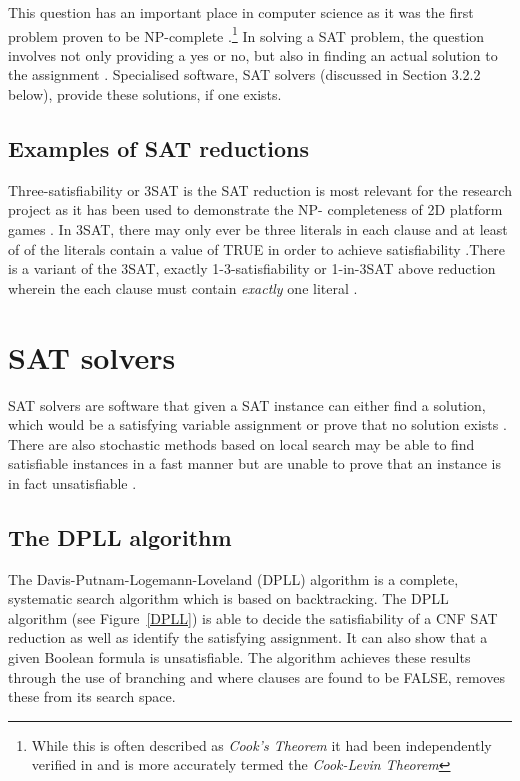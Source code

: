 \documentclass[11pt, a4paper, oneside]{report} %
\begin{document}
This question has an important place in computer science as it was the first problem proven to be
NP-complete \cite{cook1971complexity}.\footnote{While this is often described as \textit{Cook's
Theorem} it had been independently verified in \cite{levin1973universal} and is more accurately
termed the \textit{Cook-Levin Theorem}} In solving a SAT problem, the question involves not only
providing a yes or no, but also in finding an actual solution to the assignment
\cite{zhang2002quest}. Specialised software, SAT solvers (discussed in Section 3.2.2 below), provide
these solutions, if one exists.

\subsection{Examples of SAT reductions}

Three-satisfiability or 3SAT is the SAT reduction is most relevant for the research project as it
has been used to demonstrate the NP- completeness of 2D platform games  \cite{Aloupis2012}. In 3SAT,
there may only ever be three literals in each clause and at least of of the literals contain a value
of TRUE in order to achieve satisfiability \cite{balyo2010solving}.There is a variant of the 3SAT,
exactly 1-3-satisfiability or 1-in-3SAT above reduction wherein the each clause must contain
\textit{exactly} one literal \cite{balyo2010solving, du2011theory}.


\section{SAT solvers}

SAT solvers are software that given a SAT instance can either find a solution, which would be a
satisfying variable assignment or prove that no solution exists \cite{zhang2002quest}. There are
also stochastic methods based on local search may be able to find satisfiable instances in a fast
manner but are unable to prove that an instance is in fact unsatisfiable
\cite{gomes2008satisfiability}.


\subsection{The DPLL algorithm}

The Davis-Putnam-Logemann-Loveland (DPLL) algorithm \cite{davis1962machine} is a complete,
systematic search algorithm which is based on backtracking. The DPLL algorithm (see Figure~\ref{DPLL}) is able to decide the
satisfiability of a CNF SAT reduction as well as identify the satisfying assignment. It can also
show that a given Boolean formula is unsatisfiable. The algorithm achieves these results through the
use of branching and where clauses are found to be FALSE, removes these from its search space. 
\end{document}
